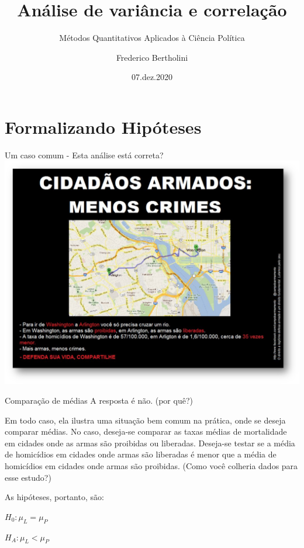 \documentclass[
  9pt,
  ignorenonframetext,
  aspectratio=169]{beamer}
\title{Análise de variância e correlação}
\subtitle{Métodos Quantitativos Aplicados à Ciência Política}
\author{Frederico Bertholini}
\date{07.dez.2020}
\begin{document}
\frame{\titlepage}

\begin{frame}[allowframebreaks]
  \tableofcontents[hideallsubsections]
\end{frame}
\hypertarget{formalizando-hipuxf3teses}{%
\section{Formalizando Hipóteses}\label{formalizando-hipuxf3teses}}

\begin{frame}{Um caso comum - Esta análise está correta?}
\protect\hypertarget{um-caso-comum---esta-anuxe1lise-estuxe1-correta}{}
\includegraphics{imgs/armas_crime.png}
\end{frame}

\begin{frame}{Comparação de médias}
\protect\hypertarget{comparauxe7uxe3o-de-muxe9dias}{}
A resposta é não. (por quê?)

Em todo caso, ela ilustra uma situação bem comum na prática, onde se
deseja comparar médias. No caso, deseja-se comparar as taxas médias de
mortalidade em cidades onde as armas são proibidas ou liberadas.
Deseja-se testar se a média de homicídios em cidades onde armas são
liberadas é menor que a média de homicídios em cidades onde armas são
proibidas. (Como você colheria dados para esse estudo?)

As hipóteses, portanto, são:

\(H_0:\mu_L=\mu_P\)

\(H_A:\mu_L<\mu_P\)
\end{frame}
\end{document}
